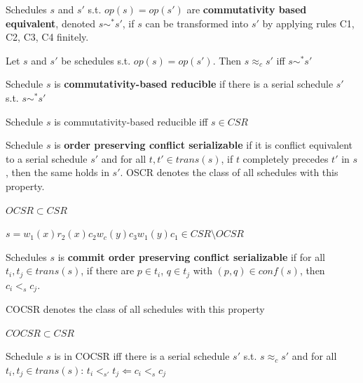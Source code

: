 \documentclass[11pt]{article}
\begin{document}
\begin{definition}[]
Schedules \(s\) and \(s'\) s.t. \(op(s)=op(s')\) are \textbf{commutativity based equivalent},
denoted \(s\sim^*s'\), if \(s\) can be transformed into \(s'\) by applying rules C1, C2, C3, C4 finitely.
\end{definition}

\begin{theorem}[]
Let \(s\) and \(s'\)  be schedules s.t. \(op(s)=op(s')\). Then \(s\approx_cs'\) iff \(s\sim^*s'\)
\end{theorem}

\begin{definition}[]
Schedule \(s\) is \textbf{commutativity-based reducible} if there is a serial schedule \(s'\) s.t. \(s\sim^*s'\)
\end{definition}

\begin{corollary}[]
Schedule \(s\) is commutativity-based reducible iff \(s\in CSR\)
\end{corollary}

\begin{definition}[]
Schedule \(s\) is \textbf{order preserving conflict serializable} if it is conflict equivalent to a
serial schedule \(s'\) and for all \(t,t'\in trans(s)\), if \(t\) completely precedes \(t'\)
in \(s\), then the same holds in \(s'\). OSCR denotes the class of all schedules with this property.
\end{definition}

\begin{theorem}[]
\(OCSR\subset CSR\)
\end{theorem}

\(s=w_1(x)r_2(x)c_2w_c(y)c_3w_1(y)c_1\in CSR\setminus OCSR\)


\begin{definition}[]
Schedules \(s\) is \textbf{commit order preserving conflict serializable} if for
all \(t_i,t_j\in trans(s)\), if there are \(p\in t_i\), \(q\in t_j\) with \((p,q)\in conf(s)\),
then \(c_i<_sc_j\).

COCSR denotes the class of all schedules with this property
\end{definition}

\begin{theorem}[]
\(COCSR\subset CSR\)
\end{theorem}

\begin{theorem}[]
Schedule \(s\) is in COCSR iff there is a serial schedule \(s'\) s.t. \(s\approx_cs'\) and for
all \(t_i,t_j\in trans(s)\): \(t_i<_{s'}t_j\Leftarrow c_i<_{s}c_j\)
\end{theorem}
\end{document}
